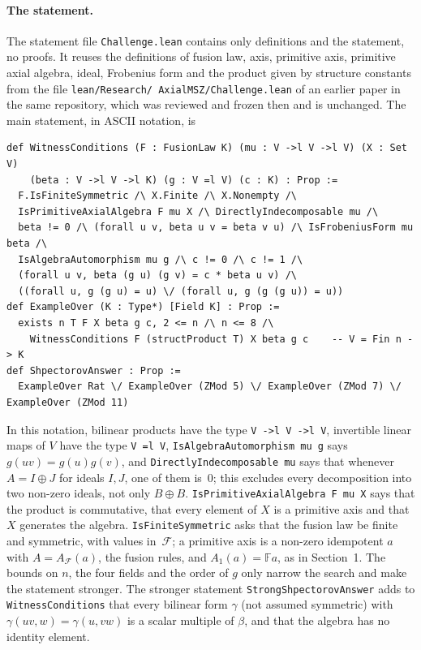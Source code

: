 \documentclass[11pt]{article}
\theoremstyle{remark}
\newcommand{\F}{\mathbb{F}}
\begin{document}
\paragraph{The statement.}
The statement file \texttt{Challenge.lean} contains only definitions and the
statement, no proofs. It reuses the definitions of fusion law, axis, primitive
axis, primitive axial algebra, ideal, Frobenius form and the product given by
structure constants from the file \texttt{lean/\allowbreak Research/\allowbreak
AxialMSZ/\allowbreak Challenge.lean} of an earlier paper in the same
repository, which was reviewed and frozen then and is unchanged. The main
statement, in ASCII notation, is
{\footnotesize
\begin{verbatim}
def WitnessConditions (F : FusionLaw K) (mu : V ->l V ->l V) (X : Set V)
    (beta : V ->l V ->l K) (g : V =l V) (c : K) : Prop :=
  F.IsFiniteSymmetric /\ X.Finite /\ X.Nonempty /\
  IsPrimitiveAxialAlgebra F mu X /\ DirectlyIndecomposable mu /\
  beta != 0 /\ (forall u v, beta u v = beta v u) /\ IsFrobeniusForm mu beta /\
  IsAlgebraAutomorphism mu g /\ c != 0 /\ c != 1 /\
  (forall u v, beta (g u) (g v) = c * beta u v) /\
  ((forall u, g (g u) = u) \/ (forall u, g (g (g u)) = u))
def ExampleOver (K : Type*) [Field K] : Prop :=
  exists n T F X beta g c, 2 <= n /\ n <= 8 /\
    WitnessConditions F (structProduct T) X beta g c    -- V = Fin n -> K
def ShpectorovAnswer : Prop :=
  ExampleOver Rat \/ ExampleOver (ZMod 5) \/ ExampleOver (ZMod 7) \/ ExampleOver (ZMod 11)
\end{verbatim}}
\noindent In this notation, bilinear products have the type
\texttt{V ->l V ->l V}, invertible linear maps of $V$ have the type
\texttt{V =l V}, \texttt{IsAlgebraAutomorphism mu g} says $g(uv)=g(u)g(v)$, and
\texttt{DirectlyIndecomposable mu} says that whenever $A=I\oplus J$ for ideals
$I,J$, one of them is~$0$; this excludes every decomposition into two non-zero
ideals, not only $B\oplus B$. \texttt{IsPrimitiveAxialAlgebra F mu X} says
that the product is commutative, that every element of $X$ is a primitive axis
and that $X$ generates the algebra. \texttt{IsFiniteSymmetric} asks that the fusion
law be finite and symmetric, with values in~$\mathcal F$; a primitive axis is
a non-zero idempotent $a$ with $A=A_{\mathcal F}(a)$, the fusion rules, and
$A_1(a)=\F a$, as in Section~1. The bounds on $n$, the four fields and the
order of $g$ only narrow the search and make the statement stronger. The
stronger statement \texttt{StrongShpectorovAnswer} adds to
\texttt{WitnessConditions} that every bilinear form $\gamma$ (not assumed
symmetric) with $\gamma(uv,w)=\gamma(u,vw)$ is a scalar multiple of $\beta$,
and that the algebra has no identity element.
\end{document}
